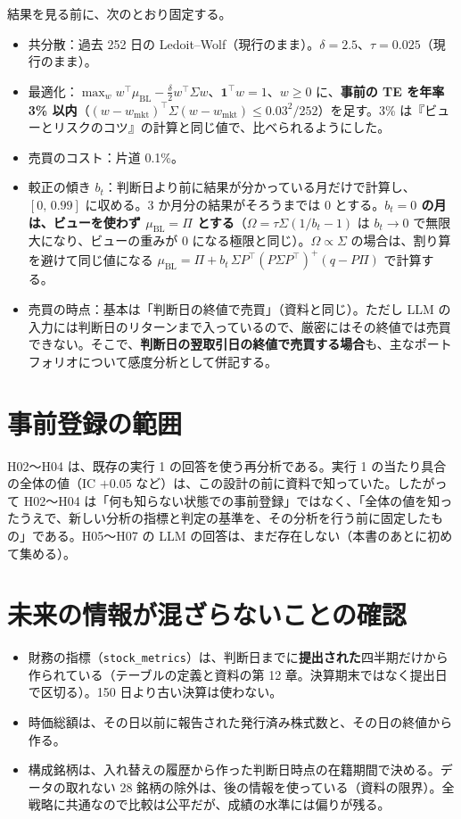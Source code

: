 \documentclass[xelatex,ja=standard,jafont=haranoaji,a4paper,10pt,openany]{bxjsreport}
\newcommand{\code}[1]{\texttt{#1}}
\newcommand{\T}{^{\top}}
\newcommand{\muBL}{\mu_{\mathrm{BL}}}
\newcommand{\wmkt}{w_{\mathrm{mkt}}}
\newcommand{\one}{\mathbf{1}}
\begin{document}
結果を見る前に、次のとおり固定する。

\begin{itemize}
\item 共分散：過去 252 日の Ledoit--Wolf（現行のまま）。$\delta=2.5$、$\tau=0.025$（現行のまま）。
\item 最適化：$\max_w w\T\muBL-\frac{\delta}{2}w\T\Sigma w$、$\one\T w=1$、$w\ge0$ に、\textbf{事前の TE を年率 3\% 以内}（$(w-\wmkt)\T\Sigma(w-\wmkt)\le0.03^2/252$）を足す。3\% は『ビューとリスクのコツ』の計算と同じ値で、比べられるようにした。
\item 売買のコスト：片道 0.1\%。
\item 較正の傾き $b_t$：判断日より前に結果が分かっている月だけで計算し、$[0,\,0.99]$ に収める。3 か月分の結果がそろうまでは 0 とする。\textbf{$b_t=0$ の月は、ビューを使わず $\muBL=\Pi$ とする}（$\Omega=\tau\Sigma(1/b_t-1)$ は $b_t\to0$ で無限大になり、ビューの重みが 0 になる極限と同じ）。$\Omega\propto\Sigma$ の場合は、割り算を避けて同じ値になる $\muBL=\Pi+b_t\,\Sigma P\T(P\Sigma P\T)^{+}(q-P\Pi)$ で計算する。
\item 売買の時点：基本は「判断日の終値で売買」（資料と同じ）。ただし LLM の入力には判断日のリターンまで入っているので、厳密にはその終値では売買できない。そこで、\textbf{判断日の翌取引日の終値で売買する場合}も、主なポートフォリオについて感度分析として併記する。
\end{itemize}

\section{事前登録の範囲}

H02〜H04 は、既存の実行 1 の回答を使う再分析である。実行 1 の当たり具合の全体の値（IC $+0.05$ など）は、この設計の前に資料で知っていた。したがって H02〜H04 は「何も知らない状態での事前登録」ではなく、「全体の値を知ったうえで、新しい分析の指標と判定の基準を、その分析を行う前に固定したもの」である。H05〜H07 の LLM の回答は、まだ存在しない（本書のあとに初めて集める）。

\section{未来の情報が混ざらないことの確認}

\begin{itemize}
\item 財務の指標（\code{stock\_metrics}）は、判断日までに\textbf{提出された}四半期だけから作られている（テーブルの定義と資料の第 12 章。決算期末ではなく提出日で区切る）。150 日より古い決算は使わない。
\item 時価総額は、その日以前に報告された発行済み株式数と、その日の終値から作る。
\item 構成銘柄は、入れ替えの履歴から作った判断日時点の在籍期間で決める。データの取れない 28 銘柄の除外は、後の情報を使っている（資料の限界）。全戦略に共通なので比較は公平だが、成績の水準には偏りが残る。
\end{itemize}
\end{document}
